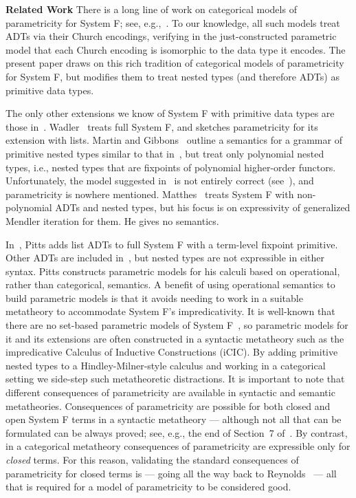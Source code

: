 \documentclass{lmcs}
\theoremstyle{plain}\newtheorem{satz}[thm]{Satz}
\begin{document}
\vspace*{0.05in}

\noindent
{\bf Related Work}\/ There is a long line of work on categorical
models of parametricity for System F; see,
e.g.,~\cite{bfss90,bm05,dr04,gjfor15,has94,jac99,mr92,rr94}.  To our
knowledge, all such models treat ADTs via their Church encodings,
verifying in the just-constructed parametric model that each Church
encoding is isomorphic to the data type it encodes.  The present paper
draws on this rich tradition of categorical models of parametricity
for System F, but modifies them to treat nested types (and therefore
ADTs) as primitive data types.

The only other extensions we know of System F with primitive data
types are those in~\cite{mat11,mg01,pit98,pit00,wad89}.
Wadler~\cite{wad89} treats full System F, and sketches parametricity
for its extension with lists. Martin and Gibbons~\cite{mg01} outline a
semantics for a grammar of primitive nested types similar to that
in~\cite{jp19}, but treat only polynomial nested types, i.e., nested
types that are fixpoints of polynomial higher-order
functors. Unfortunately, the model suggested in~\cite{mg01} is not
entirely correct (see~\cite{jp19}), and parametricity is nowhere
mentioned.  Matthes~\cite{mat11} treats System F with non-polynomial
ADTs and nested types, but his focus is on expressivity of generalized
Mendler iteration for them. He gives no semantics.

In~\cite{pit00}, Pitts adds list ADTs to full System F with a
term-level fixpoint primitive. Other ADTs are included
in~\cite{pit98}, but nested types are not expressible in either
syntax. Pitts constructs parametric models for his calculi based on
operational, rather than categorical, semantics. A benefit of using
operational semantics to build parametric models is that it avoids
needing to work in a suitable metatheory to accommodate System F's
impredicativity. It is well-known that there are no set-based
parametric models of System F~\cite{rey84}, so parametric models for
it and its extensions are often constructed in a syntactic metatheory
such as the impredicative Calculus of Inductive Constructions (iCIC).
By adding primitive nested types to a Hindley-Milner-style calculus
and working in a categorical setting we side-step such metatheoretic
distractions. It is important to note that different consequences of
parametricity are available in syntactic and semantic
metatheories. Consequences of parametricity are possible for both
closed and open System F terms in a syntactic metatheory --- although
not all that can be formulated can be always proved; see, e.g., the
end of Section~7 of~\cite{bm98}. By contrast, in a categorical
metatheory consequences of parametricity are expressible only for {\em
  closed} terms. For this reason, validating the standard consequences
of parametricity for closed terms is --- going all the way back to
Reynolds~\cite{rey83} --- all that is required for a model of
parametricity to be considered good.
\end{document}
